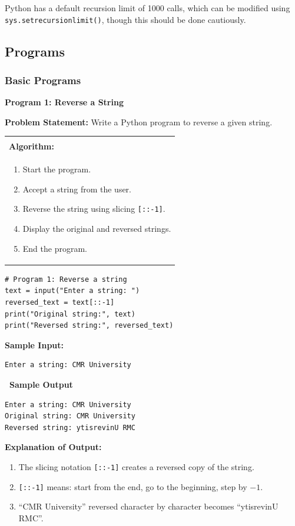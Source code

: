 \documentclass[12pt,a4paper]{article}
\makeatletter
\newcommand{\outhead}{\noindent\colorbox{cmrgreen!25}%
  {\textbf{\small\color{cmrdark}~Sample Output~}}\par\vspace{-1pt}}
\newenvironment{algobox}{%
  \par\vspace{4pt}%
  \noindent\begin{tabular}{@{}p{\linewidth}@{}}%
  \hline\\[-8pt]%
  \textbf{\color{blue!60!black}\small Algorithm:}\\[2pt]%
}{%
  \\[-4pt]\hline%
  \end{tabular}\par\vspace{4pt}%
}
\makeatother
\begin{document}
Python has a default recursion limit of 1000 calls, which can be modified using \texttt{sys.setrecursionlimit()}, though this should be done cautiously.

\subsection{Programs}
\subsubsection{Basic Programs}

\textbf{Program 1: Reverse a String}

\textbf{Problem Statement:}
Write a Python program to reverse a given string.

\begin{algobox}
\begin{enumerate}[label=Step \arabic*:]
  \item Start the program.
  \item Accept a string from the user.
  \item Reverse the string using slicing \texttt{[::-1]}.
  \item Display the original and reversed strings.
  \item End the program.
\end{enumerate}
\end{algobox}

\begin{lstlisting}
# Program 1: Reverse a string
text = input("Enter a string: ")
reversed_text = text[::-1]
print("Original string:", text)
print("Reversed string:", reversed_text)
\end{lstlisting}

\textbf{Sample Input:}
\begin{verbatim}
Enter a string: CMR University
\end{verbatim}

\outhead
\begin{lstlisting}[style=outputstyle]
Enter a string: CMR University
Original string: CMR University
Reversed string: ytisrevinU RMC
\end{lstlisting}

\textbf{Explanation of Output:}
\begin{enumerate}
  \item The slicing notation \texttt{[::-1]} creates a reversed copy of the string.
  \item \texttt{[::-1]} means: start from the end, go to the beginning, step by $-1$.
  \item ``CMR University'' reversed character by character becomes ``ytisrevinU RMC''.
\end{enumerate}
\end{document}
